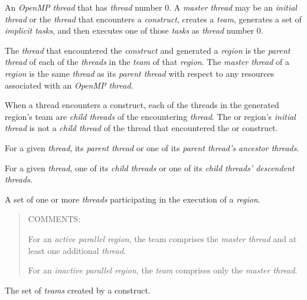 \glossarydefstart
An \emph{OpenMP thread} that has  \emph{thread} number 0. A \emph{master
thread} may be an \emph{initial thread} or the \emph{thread} that encounters a
 \emph{construct}, creates a \emph{team}, generates a set of
\emph{implicit tasks}, and then executes one of those \emph{tasks} as
\emph{thread} number 0.
\glossarydefend

\glossarydefstart
The \emph{thread} that encountered the  \emph{construct} and generated a 
 \emph{region} is the \emph{parent thread} of each of the 
\emph{threads} in the \emph{team} of that 
 \emph{region}. The \emph{master thread} 
of a  \emph{region} is the same \emph{thread} 
as its \emph{parent thread} with respect to any resources associated with an \emph{OpenMP thread}.
\glossarydefend

\glossarydefstart
When a thread encounters a  construct, each of the threads in the 
generated  region's team are \emph{child threads} of the encountering \emph{thread}. 
The  or  region's \emph{initial thread} is not a \emph{child thread} of the thread 
that encountered the  or  construct. 
\glossarydefend

\glossarydefstart
For a given \emph{thread}, its \emph{parent thread} or one of its \emph{parent thread's ancestor threads}.
\glossarydefend

\glossarydefstart
For a given \emph{thread}, one of its \emph{child threads} or one of 
its \emph{child threads' descendent threads}.
\glossarydefend

\glossarydefstart
A set of one or more \emph{threads} participating in the execution of a 
\emph{region}.

\begin{quote}
COMMENTS:

For an \emph{active parallel region}, the team comprises the \emph{master thread} 
and at least one additional \emph{thread}.

For an \emph{inactive parallel region}, the \emph{team} comprises only the \emph{master thread}.
\end{quote}
\glossarydefend

\glossarydefstart
The set of \emph{teams} created by a  construct.
\glossarydefend

